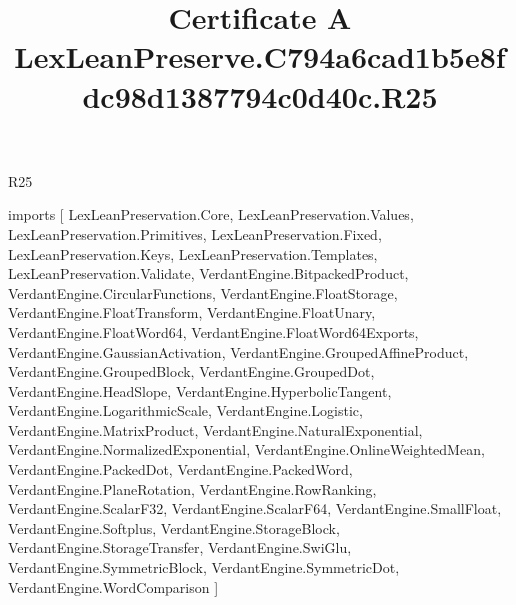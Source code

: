 \begin{lexlean}{R25}
\title{Certificate A LexLeanPreserve.C794a6cad1b5e8fdc98d1387794c0d40c.R25}
\begin{coremodule}
imports [
  LexLeanPreservation.Core,
  LexLeanPreservation.Values,
  LexLeanPreservation.Primitives,
  LexLeanPreservation.Fixed,
  LexLeanPreservation.Keys,
  LexLeanPreservation.Templates,
  LexLeanPreservation.Validate,
  VerdantEngine.BitpackedProduct,
  VerdantEngine.CircularFunctions,
  VerdantEngine.FloatStorage,
  VerdantEngine.FloatTransform,
  VerdantEngine.FloatUnary,
  VerdantEngine.FloatWord64,
  VerdantEngine.FloatWord64Exports,
  VerdantEngine.GaussianActivation,
  VerdantEngine.GroupedAffineProduct,
  VerdantEngine.GroupedBlock,
  VerdantEngine.GroupedDot,
  VerdantEngine.HeadSlope,
  VerdantEngine.HyperbolicTangent,
  VerdantEngine.LogarithmicScale,
  VerdantEngine.Logistic,
  VerdantEngine.MatrixProduct,
  VerdantEngine.NaturalExponential,
  VerdantEngine.NormalizedExponential,
  VerdantEngine.OnlineWeightedMean,
  VerdantEngine.PackedDot,
  VerdantEngine.PackedWord,
  VerdantEngine.PlaneRotation,
  VerdantEngine.RowRanking,
  VerdantEngine.ScalarF32,
  VerdantEngine.ScalarF64,
  VerdantEngine.SmallFloat,
  VerdantEngine.Softplus,
  VerdantEngine.StorageBlock,
  VerdantEngine.StorageTransfer,
  VerdantEngine.SwiGlu,
  VerdantEngine.SymmetricBlock,
  VerdantEngine.SymmetricDot,
  VerdantEngine.WordComparison
]


\end{coremodule}
\end{lexlean}
